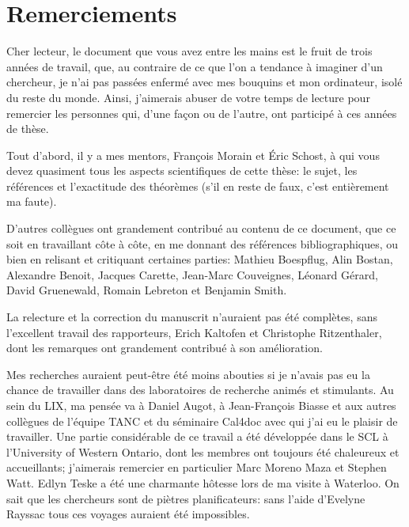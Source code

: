 


\chapter*{Remerciements}

Cher lecteur, le document que vous avez entre les mains est le fruit
de trois années de travail, que, au contraire de ce que l'on a
tendance à imaginer d'un chercheur, je n'ai pas passées enfermé avec
mes bouquins et mon ordinateur, isolé du reste du monde. Ainsi,
j'aimerais abuser de votre temps de lecture pour remercier les
personnes qui, d'une façon ou de l'autre, ont participé à ces années
de thèse.

Tout d'abord, il y a mes mentors, François Morain et Éric Schost, à
qui vous devez quasiment tous les aspects scientifiques de cette
thèse: le sujet, les références et l'exactitude des théorèmes (s'il en
reste de faux, c'est entièrement ma faute).

D'autres collègues ont grandement contribué au contenu de ce document,
que ce soit en travaillant côte à côte, en me donnant des références
bibliographiques, ou bien en relisant et critiquant certaines parties:
Mathieu Boespflug, Alin Bostan, Alexandre Benoit, Jacques Carette,
Jean-Marc Couveignes, Léonard Gérard, David Gruenewald, Romain
Lebreton et Benjamin Smith.

La relecture et la correction du manuscrit n'auraient pas été
complètes, sans l'excellent travail des rapporteurs, Erich Kaltofen et
Christophe Ritzenthaler, dont les remarques ont grandement contribué à
son amélioration. 

Mes recherches auraient peut-être été moins abouties si je n'avais pas
eu la chance de travailler dans des laboratoires de recherche animés
et stimulants. Au sein du LIX, ma pensée va à Daniel Augot, à
Jean-François Biasse et aux autres collègues de l'équipe TANC et du
séminaire Cal4doc avec qui j'ai eu le plaisir de travailler.  Une
partie considérable de ce travail a été développée dans le SCL à
l'University of Western Ontario, dont les membres ont toujours été
chaleureux et accueillants; j'aimerais remercier en particulier Marc
Moreno Maza et Stephen Watt. Edlyn Teske a été une charmante hôtesse
lors de ma visite à Waterloo.  On sait que les chercheurs sont de
piètres planificateurs: sans l'aide d'Evelyne Rayssac tous ces voyages
auraient été impossibles.

